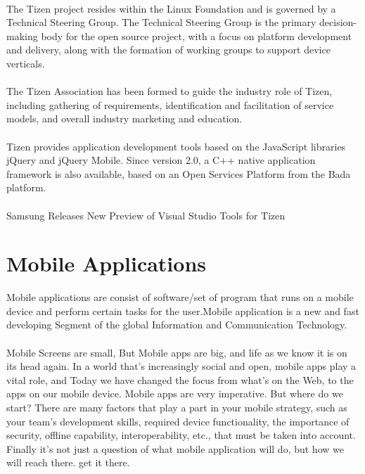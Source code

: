 \paragraph{}
The Tizen project resides within the Linux Foundation and is governed by a Technical Steering Group. The Technical Steering Group is the primary decision-making body for the open source project, with a focus on platform development and delivery, along with the formation of working groups to support device verticals.

\paragraph{}
The Tizen Association has been formed to guide the industry role of Tizen, including gathering of requirements, identification and facilitation of service models, and overall industry marketing and education.


\paragraph{}
Tizen provides application development tools based on the JavaScript libraries jQuery and jQuery Mobile.
Since version 2.0, a C++ native application framework is also available, based on an Open Services Platform from the Bada platform.

\paragraph{}
Samsung Releases New Preview of Visual Studio Tools for Tizen


\section{ Mobile Applications}


Mobile applications are consist of software/set of program that runs on a mobile device and perform certain tasks for the user.Mobile application is a new and fast developing Segment of the global Information and Communication Technology.
\paragraph{}
Mobile Screens are small, But Mobile apps are big, and life as we know it is on its head again.
In a world that's increasingly social and open, mobile apps play a vital role, and Today we have changed the focus from what's on the Web, to the apps on our mobile device. Mobile apps are very imperative. But where do we  start?  There are many factors that play a part in your mobile strategy, such as your team’s development skills, required device functionality, the importance of security, offline capability, interoperability, etc., that must be taken into account. Finally it’s not just a question of what mobile application  will do, but how we will reach there. get it there.

